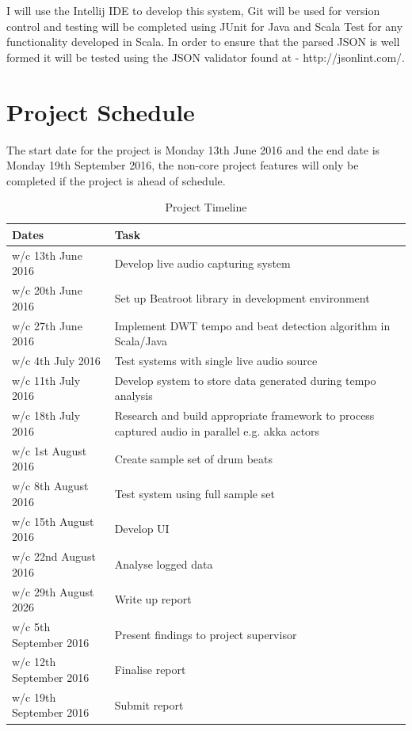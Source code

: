 \documentclass[a4paper, 11pt]{article}
\begin{document}
I will use the Intellij IDE to develop this system, Git will be used for version control and testing will be completed using JUnit for Java and Scala Test for any functionality developed in Scala. In order to ensure that the parsed JSON is well formed it will be tested using the JSON validator found at - http://jsonlint.com/.

\clearpage
\maketitle{} 
\section {Project Schedule}
The start date for the project is Monday 13th June 2016 and the end date is Monday 19th September 2016, the non-core project features will only be completed if the project is ahead of schedule.
\begin{table}[h]
\caption{Project Timeline} 
\centering
\begin{tabular}{|p{4cm}|p{8cm}|}
 \hline
\textbf{Dates} & \textbf{Task}\\ [0.5ex]
\hline 
w/c 13th June 2016 & Develop live audio capturing system\\
\hline 
w/c 20th June 2016 & Set up Beatroot library in development environment\\
\hline 
w/c 27th June 2016 & Implement DWT tempo and beat detection algorithm in Scala/Java\\
\hline 
w/c 4th July 2016 & Test systems with single live audio source\\
\hline 
w/c 11th July 2016 & Develop system to store data generated during tempo analysis\\
\hline 
w/c 18th July 2016 & Research and build appropriate framework to process captured audio in parallel e.g. akka actors\\
\hline 
w/c 1st August 2016 & Create sample set of drum beats\\
\hline 
w/c 8th August 2016 & Test system using full sample set\\
\hline 
w/c 15th August 2016 & Develop UI\\
\hline 
w/c 22nd August 2016 & Analyse logged data\\
\hline 
w/c 29th August 2026 & Write up report\\
\hline 
w/c 5th September 2016 & Present findings to project supervisor\\
\hline 
w/c 12th September 2016 & Finalise report\\
\hline 
w/c 19th September 2016 & Submit report\\
\hline
\end{tabular}
\end{table}
\clearpage
\maketitle{} 
\end{document}
